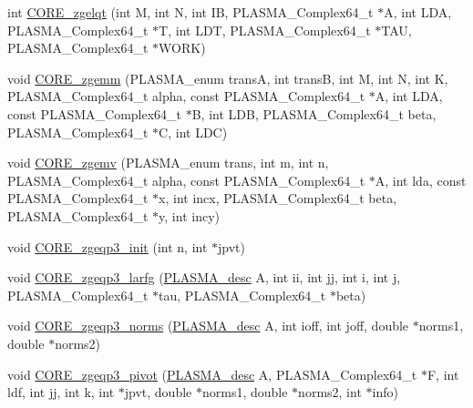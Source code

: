 \begin{DoxyCompactItemize}
\item 
int \hyperlink{group__CORE__PLASMA__Complex64__t_ga02a2e4ebf4c4ec095999f95d43e55acc_ga02a2e4ebf4c4ec095999f95d43e55acc}{C\+O\+R\+E\+\_\+zgelqt} (int M, int N, int I\+B, P\+L\+A\+S\+M\+A\+\_\+\+Complex64\+\_\+t $\ast$A, int L\+D\+A, P\+L\+A\+S\+M\+A\+\_\+\+Complex64\+\_\+t $\ast$T, int L\+D\+T, P\+L\+A\+S\+M\+A\+\_\+\+Complex64\+\_\+t $\ast$T\+A\+U, P\+L\+A\+S\+M\+A\+\_\+\+Complex64\+\_\+t $\ast$W\+O\+R\+K)
\item 
void \hyperlink{group__CORE__PLASMA__Complex64__t_gaf2294d196ccbe7a183e026383c152004_gaf2294d196ccbe7a183e026383c152004}{C\+O\+R\+E\+\_\+zgemm} (P\+L\+A\+S\+M\+A\+\_\+enum trans\+A, int trans\+B, int M, int N, int K, P\+L\+A\+S\+M\+A\+\_\+\+Complex64\+\_\+t alpha, const P\+L\+A\+S\+M\+A\+\_\+\+Complex64\+\_\+t $\ast$A, int L\+D\+A, const P\+L\+A\+S\+M\+A\+\_\+\+Complex64\+\_\+t $\ast$B, int L\+D\+B, P\+L\+A\+S\+M\+A\+\_\+\+Complex64\+\_\+t beta, P\+L\+A\+S\+M\+A\+\_\+\+Complex64\+\_\+t $\ast$C, int L\+D\+C)
\item 
void \hyperlink{group__CORE__PLASMA__Complex64__t_gada1456ea3b10e65c1cac31a94e9a460e_gada1456ea3b10e65c1cac31a94e9a460e}{C\+O\+R\+E\+\_\+zgemv} (P\+L\+A\+S\+M\+A\+\_\+enum trans, int m, int n, P\+L\+A\+S\+M\+A\+\_\+\+Complex64\+\_\+t alpha, const P\+L\+A\+S\+M\+A\+\_\+\+Complex64\+\_\+t $\ast$A, int lda, const P\+L\+A\+S\+M\+A\+\_\+\+Complex64\+\_\+t $\ast$x, int incx, P\+L\+A\+S\+M\+A\+\_\+\+Complex64\+\_\+t beta, P\+L\+A\+S\+M\+A\+\_\+\+Complex64\+\_\+t $\ast$y, int incy)
\item 
void \hyperlink{group__CORE__PLASMA__Complex64__t_ga3ff28c8333e833da87f1a5e969274e07_ga3ff28c8333e833da87f1a5e969274e07}{C\+O\+R\+E\+\_\+zgeqp3\+\_\+init} (int n, int $\ast$jpvt)
\item 
void \hyperlink{group__CORE__PLASMA__Complex64__t_gaa3b612371737432844f561994c5f27db_gaa3b612371737432844f561994c5f27db}{C\+O\+R\+E\+\_\+zgeqp3\+\_\+larfg} (\hyperlink{structplasma__desc__t}{P\+L\+A\+S\+M\+A\+\_\+desc} A, int ii, int jj, int i, int j, P\+L\+A\+S\+M\+A\+\_\+\+Complex64\+\_\+t $\ast$tau, P\+L\+A\+S\+M\+A\+\_\+\+Complex64\+\_\+t $\ast$beta)
\item 
void \hyperlink{group__CORE__PLASMA__Complex64__t_ga6a7f181294f28ff46ee46b94cdeedb70_ga6a7f181294f28ff46ee46b94cdeedb70}{C\+O\+R\+E\+\_\+zgeqp3\+\_\+norms} (\hyperlink{structplasma__desc__t}{P\+L\+A\+S\+M\+A\+\_\+desc} A, int ioff, int joff, double $\ast$norms1, double $\ast$norms2)
\item 
void \hyperlink{group__CORE__PLASMA__Complex64__t_ga19092fd2e8b60aca190e883813ca17bf_ga19092fd2e8b60aca190e883813ca17bf}{C\+O\+R\+E\+\_\+zgeqp3\+\_\+pivot} (\hyperlink{structplasma__desc__t}{P\+L\+A\+S\+M\+A\+\_\+desc} A, P\+L\+A\+S\+M\+A\+\_\+\+Complex64\+\_\+t $\ast$F, int ldf, int jj, int k, int $\ast$jpvt, double $\ast$norms1, double $\ast$norms2, int $\ast$info)

\end{DoxyCompactItemize}

